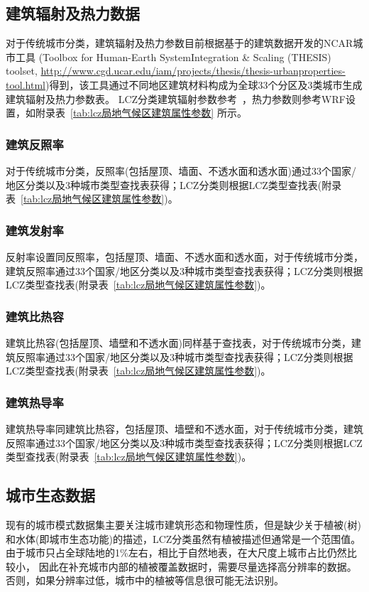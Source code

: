 \subsection{建筑辐射及热力数据}\label{建筑辐射及热力数据}
对于传统城市分类，建筑辐射及热力参数目前根据\citet{oleson2020parameterization}基于\citet{jackson2010parameterization}的建筑数据开发的NCAR城市工具
(Toolbox for Human-Earth SystemIntegration \& Scaling (THESIS) toolset, \url{http://www.cgd.ucar.edu/iam/projects/thesis/thesis-urbanproperties-tool.html})得到，该工具通过不同地区建筑材料构成为全球33个分区及3类城市生成建筑辐射及热力参数表。
LCZ分类建筑辐射参数参考~\citet{stewart2014evaluation}，热力参数则参考WRF设置，如附录表~\ref{tab:lcz局地气候区建筑属性参数} 所示。

\subsubsection{建筑反照率}\label{建筑反照率}
对于传统城市分类，反照率(包括屋顶、墙面、不透水面和透水面)通过33个国家/地区分类以及3种城市类型查找表获得；LCZ分类则根据LCZ类型查找表(附录表~\ref{tab:lcz局地气候区建筑属性参数})。

\subsubsection{建筑发射率}\label{建筑发射率}
反射率设置同反照率，包括屋顶、墙面、不透水面和透水面，对于传统城市分类，建筑反照率通过33个国家/地区分类以及3种城市类型查找表获得；LCZ分类则根据LCZ类型查找表(附录表~\ref{tab:lcz局地气候区建筑属性参数})。

\subsubsection{建筑比热容}\label{建筑比热容}
建筑比热容(包括屋顶、墙壁和不透水面)同样基于查找表，对于传统城市分类，建筑反照率通过33个国家/地区分类以及3种城市类型查找表获得；LCZ分类则根据LCZ类型查找表(附录表~\ref{tab:lcz局地气候区建筑属性参数})。

\subsubsection{建筑热导率}\label{建筑热导率}
建筑热导率同建筑比热容，包括屋顶、墙壁和不透水面，对于传统城市分类，建筑反照率通过33个国家/地区分类以及3种城市类型查找表获得；LCZ分类则根据LCZ类型查找表(附录表~\ref{tab:lcz局地气候区建筑属性参数})。

\subsection{城市生态数据}\label{城市生态数据}
现有的城市模式数据集主要关注城市建筑形态和物理性质，但是缺少关于植被(树)和水体(即城市生态功能)的描述，LCZ分类虽然有植被描述但通常是一个范围值。由于城市只占全球陆地的1\%左右，相比于自然地表，在大尺度上城市占比仍然比较小，
因此在补充城市内部的植被覆盖数据时，需要尽量选择高分辨率的数据。否则，如果分辨率过低，城市中的植被等信息很可能无法识别。


